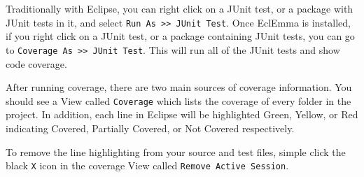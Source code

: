 \documentclass[11pt]{article}
\begin{document}
Traditionally with Eclipse, you can right click on a JUnit test, or a package
with JUnit tests in it, and select \texttt{Run As >> JUnit Test}. Once EclEmma is
installed, if you right click on a JUnit test, or a package containing JUnit
tests, you can go to \texttt{Coverage As >> JUnit Test}. This will run all of the
JUnit tests and show code coverage.

After running coverage, there are two main sources of coverage information. You
should see a View called \texttt{Coverage} which lists the coverage of every
folder in the project. In addition, each line in Eclipse will be highlighted
Green, Yellow, or Red indicating Covered, Partially Covered, or Not Covered
respectively.

To remove the line highlighting from your source and test files, simple click
the black \texttt{X} icon in the coverage View called \texttt{Remove Active Session}.
\end{document}
